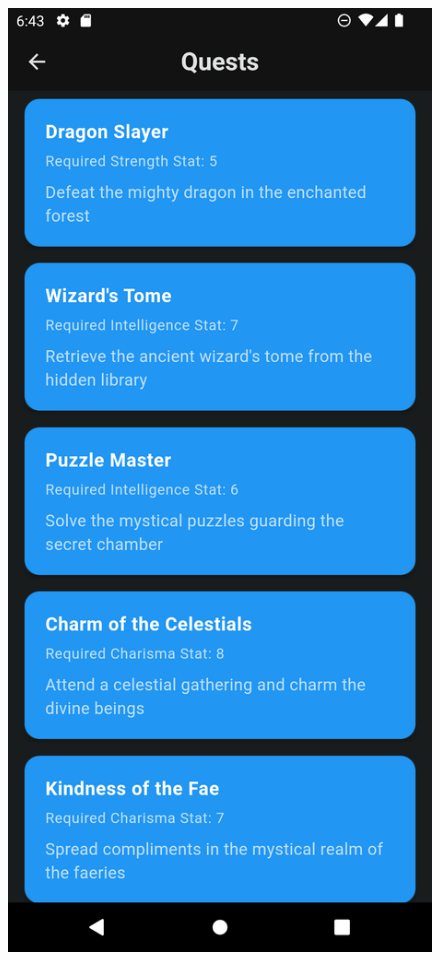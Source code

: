 \documentclass{l4proj}
\begin{document}
\begin{figure}
\centering
\begin{minipage}{.5\textwidth}
  \centering
  \includegraphics[width=.6\linewidth]{images/Quests.png}
  \label{fig:Quests}
\end{minipage}%
\begin{minipage}{.5\textwidth}
  \centering

\end{minipage}
\end{figure}
\end{document}
